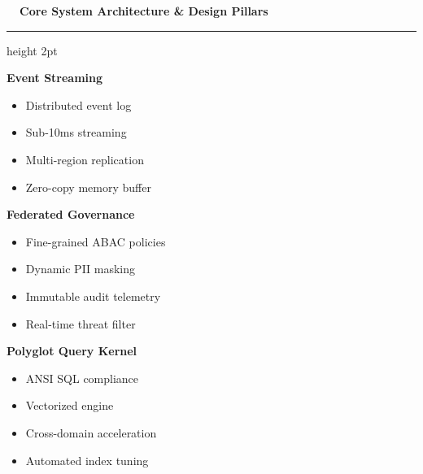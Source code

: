\documentclass[landscape]{slides}
\newcommand{\slidetitle}[1]{%
  {\Large\bfseries\color{NavyDark} #1}\par\vspace{0.3em}%
  {\color{TealAccent}\hrule height 2pt}\vspace{0.6em}%
}
\begin{document}
\begin{slide}
\slidetitle{\faCogs~~Core System Architecture \& Design Pillars}

\begin{minipage}[t]{0.31\textwidth}
  \begin{tcolorbox}[colback=CardBg,colframe=TealAccent,title=\textbf{\faNetworkWired~~Synapse Bus}]
    \small
    \textbf{Event Streaming}
    \begin{itemize}
      \item Distributed event log
      \item Sub-10ms streaming
      \item Multi-region replication
      \item Zero-copy memory buffer
    \end{itemize}
  \end{tcolorbox}
\end{minipage}%
\hfill
\begin{minipage}[t]{0.31\textwidth}
  \begin{tcolorbox}[colback=CardBg,colframe=NavyDark,title=\textbf{\faLock~~Policy Engine}]
    \small
    \textbf{Federated Governance}
    \begin{itemize}
      \item Fine-grained ABAC policies
      \item Dynamic PII masking
      \item Immutable audit telemetry
      \item Real-time threat filter
    \end{itemize}
  \end{tcolorbox}
\end{minipage}%
\hfill
\begin{minipage}[t]{0.31\textwidth}
  \begin{tcolorbox}[colback=CardBg,colframe=CoralAccent,title=\textbf{\faDatabase~~Meridian SQL}]
    \small
    \textbf{Polyglot Query Kernel}
    \begin{itemize}
      \item ANSI SQL compliance
      \item Vectorized engine
      \item Cross-domain acceleration
      \item Automated index tuning
    \end{itemize}
  \end{tcolorbox}
\end{minipage}
\end{slide}
\end{document}

